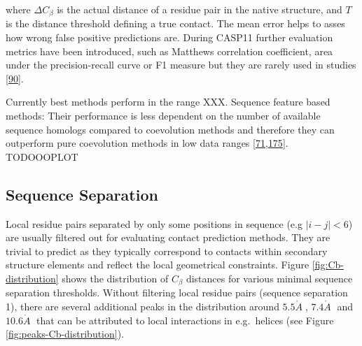 \documentclass[11pt,a4paper,twoside]{book}
\newcommand{\Cb}{C_\beta}
\newcommand{\angstrom}{\mathring{A} \;}
\theoremstyle{definition}
\theoremstyle{definition}
\theoremstyle{remark}
\begin{document}
where \(\Delta\Cb\) is the actual distance of a residue pair in the
native structure, and \(T\) is the distance threshold defining a true
contact. The mean error helps to asses how wrong false positive
predictions are. During CASP11 further evaluation metrics have been
introduced, such as Matthews correlation coefficient, area under the
precision-recall curve or F1 measure but they are rarely used in studies
{[}\protect\hyperlink{ref-Monastyrskyy2015}{90}{]}.

Currently best methods perform in the range XXX. Sequence feature based
methods: Their performance is less dependent on the number of available
sequence homologs compared to coevolution methods and therefore they can
outperform pure coevolution methods in low data ranges
{[}\protect\hyperlink{ref-Wang2013}{71},\protect\hyperlink{ref-Kosciolek2015a}{175}{]}.
TODOOOPLOT

\subsection{Sequence Separation}\label{seq-sep}

Local residue pairs separated by only some positions in sequence (e.g
\(|i-j| < 6\)) are usually filtered out for evaluating contact
prediction methods. They are trivial to predict as they typically
correspond to contacts within secondary structure elements and reflect
the local geometrical constraints. Figure \ref{fig:Cb-distribution}
shows the distribution of \(\Cb\) distances for various minimal sequence
separation thresholds. Without filtering local residue pairs (sequence
separation 1), there are several additional peaks in the distribution
around \(5.5\angstrom\), \(7.4\angstrom\) and \(10.6\angstrom\) that can
be attributed to local interactions in e.g.~helices (see Figure
\ref{fig:peaks-Cb-distribution}).
\end{document}
